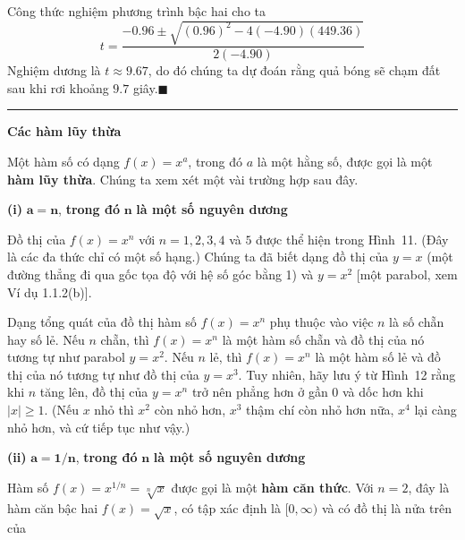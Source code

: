 \begin{minipage}[t]{0.708\textwidth}
    \fontsize{9.3pt}{13.2pt}\selectfont
    \noindent
    Công thức nghiệm phương trình bậc hai cho ta
    \begin{equation*}
    t = \frac{-0.96 \pm \sqrt{(0.96)^2 - 4(-4.90)(449.36)}}{2(-4.90)}
    \end{equation*}
    Nghiệm dương là $t \approx 9.67$, do đó chúng ta dự đoán rằng quả bóng sẽ chạm đất sau khi rơi khoảng $9.7$ giây.\hfill{\color{stewartcyan}$\blacksquare$}

    \vspace{1.2em}
    \noindent
    {\color{stewartcyan}\rule{1.2ex}{1.2ex}}\hspace{0.5em}\textbf{\textsf{\large Các hàm lũy thừa}}

    \vspace{0.4em}
    \noindent
    Một hàm số có dạng $f(x) = x^a$, trong đó $a$ là một hằng số, được gọi là một \textbf{hàm lũy thừa}. Chúng ta xem xét một vài trường hợp sau đây.

    \vspace{0.5em}
    \noindent
    \textbf{(i)} $\boldsymbol{a = n}$, \textbf{trong đó} $\boldsymbol{n}$ \textbf{là một số nguyên dương}

    \vspace{0.3em}
    \noindent
    Đồ thị của $f(x) = x^n$ với $n = 1, 2, 3, 4$ và $5$ được thể hiện trong Hình~11. (Đây là các đa thức chỉ có một số hạng.) Chúng ta đã biết dạng đồ thị của $y = x$ (một đường thẳng đi qua gốc tọa độ với hệ số góc bằng 1) và $y = x^2$ [một parabol, xem Ví dụ 1.1.2(b)].

    \vspace{0.6em}
    \noindent
    Dạng tổng quát của đồ thị hàm số $f(x) = x^n$ phụ thuộc vào việc $n$ là số chẵn hay số lẻ. Nếu $n$ chẵn, thì $f(x) = x^n$ là một hàm số chẵn và đồ thị của nó tương tự như parabol $y = x^2$. Nếu $n$ lẻ, thì $f(x) = x^n$ là một hàm số lẻ và đồ thị của nó tương tự như đồ thị của $y = x^3$. Tuy nhiên, hãy lưu ý từ Hình~12 rằng khi $n$ tăng lên, đồ thị của $y = x^n$ trở nên phẳng hơn ở gần 0 và dốc hơn khi $|x| \ge 1$. (Nếu $x$ nhỏ thì $x^2$ còn nhỏ hơn, $x^3$ thậm chí còn nhỏ hơn nữa, $x^4$ lại càng nhỏ hơn, và cứ tiếp tục như vậy.)

    \vspace{1.2em}
    \noindent
    \textbf{(ii)} $\boldsymbol{a = 1/n}$, \textbf{trong đó} $\boldsymbol{n}$ \textbf{là một số nguyên dương}

    \vspace{0.3em}
    \noindent
    Hàm số $f(x) = x^{1/n} = \sqrt[n]{x}$ được gọi là một \textbf{hàm căn thức}. Với $n = 2$, đây là hàm căn bậc hai $f(x) = \sqrt{x}$, có tập xác định là $[0, \infty)$ và có đồ thị là nửa trên của
\end{minipage}